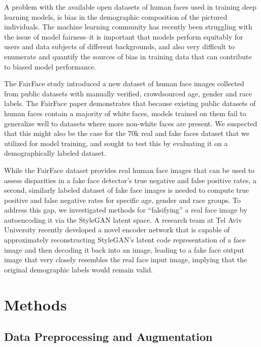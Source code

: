 \documentclass[11pt, letterpaper]{article}
\begin{document}
\begin{multicols}{2}
  A problem with the available open datasets of human faces used in training
  deep learning models, is bias in the demographic composition of the pictured
  individuals. The machine learning community has recently been struggling with
  the issue of model fairness--it is important that models perform equitably for
  users and data subjects of different backgrounds, and also very difficult to
  enumerate and quantify the sources of bias in training data that can
  contribute to biased model performance.

  The FairFace\cite{karkkainen2019fairface} study introduced a new dataset of
  human face images collected from public datasets with manually verified,
  crowdsourced age, gender and race labels. The FairFace paper demonstrates that
  because existing public datasets of human faces contain a majority of white
  faces, models trained on them fail to generalize well to datasets where more
  non-white faces are present. We suspected that this might also be the case for
  the 70k real and fake faces dataset that we utilized for model training, and
  sought to test this by evaluating it on a demographically labeled dataset.

  While the FairFace dataset provides real human face images that can be used to
  assess disparities in a fake face detector's true negative and false positive
  rates, a second, similarly labeled dataset of fake face images is needed to
  compute true positive and false negative rates for specific age, gender and
  race groups. To address this gap, we investigated methods for ``falsifying'' a
  real face image by autoencoding it via the StyleGAN latent space. A research
  team at Tel Aviv University recently developed a novel encoder
  network\cite{richardson2020encoding} that is capable of approximately
  reconstructing StyleGAN's latent code representation of a face image and then
  decoding it back into an image, leading to a fake face output image that very
  closely resembles the real face input image, implying that the original
  demographic labels would remain valid.

  \section{Methods}

  \subsection{Data Preprocessing and Augmentation}


\end{multicols}
\end{document}
